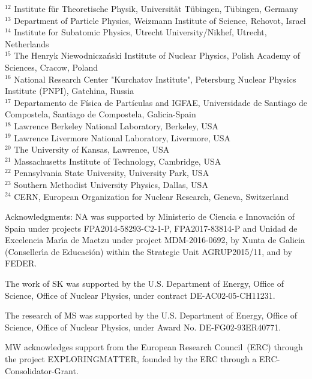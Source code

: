 \begin{flushleft}
{${^{12}}$ Institute f{\"u}r  Theoretische  Physik, Universit{\"a}t T{\"u}bingen, T{\"u}bingen, Germany\\
${^{13}}$ Department of Particle Physics, Weizmann Institute of Science, Rehovot, Israel\\
${^{14}}$ Institute for Subatomic Physics, Utrecht University/Nikhef, Utrecht, Netherlands\\
${^{15}}$ The Henryk Niewodnicza{\'n}ski Institute of Nuclear Physics, Polish Academy of Sciences, Cracow, Poland\\
${^{16}}$ National Research Center "Kurchatov Institute",
Petersburg Nuclear Physics Institute (PNPI), Gatchina, Russia\\
${^{17}}$ Departamento de F{\'i}sica de Part{\'i}culas and IGFAE,
Universidade de Santiago de Compostela, Santiago de Compostela, Galicia-Spain\\
${^{18}}$ Lawrence Berkeley National Laboratory, Berkeley, USA\\
${^{19}}$ Lawrence Livermore National Laboratory, Livermore, USA\\
${^{20}}$ The University of Kansas, Lawrence, USA\\
${^{21}}$ Massachusetts Institute of Technology, Cambridge, USA\\
${^{22}}$ Pennsylvania State University, University Park, USA\\
${^{23}}$ Southern Methodist University Physics, Dallas,  USA\\
${^{24}}$ CERN, European Organization for Nuclear Research, Geneva, Switzerland
}
\end{flushleft}

{\footnotesize Acknowledgments: 
NA was supported by Ministerio de Ciencia e Innovaci\'on of Spain under projects FPA2014-58293-C2-1-P, FPA2017-83814-P and Unidad de Excelencia Mar\'{\i}a de Maetzu under project MDM-2016-0692, by Xunta de Galicia (Conseller\'{\i}a de Educaci\'on) within the Strategic Unit AGRUP2015/11, and by FEDER. 

The work of SK was supported by the U.S. Department of Energy, Office of Science, Office of Nuclear Physics, under contract DE-AC02-05-CH11231.

The research of MS was supported by the U.S. Department of Energy, Office of Science, Office of Nuclear Physics, under Award No. DE-FG02-93ER40771.

MW acknowledges support from the European Research Council~(ERC) through the project EXPLORINGMATTER, founded by the ERC through a ERC-Consolidator-Grant.
 }
 